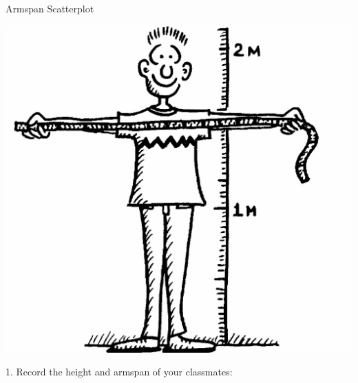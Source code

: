 \documentclass{article}
\begin{document}
 
\begin{center}
{\Huge Armspan Scatterplot}
\end{center}

\begin{center}
\includegraphics[scale=0.2]{measure-man.jpg}
\end{center}

\vspace{1cm}

{\huge 1. Record the height and armspan of your classmates:}

\vspace{1cm}
\end{document}
